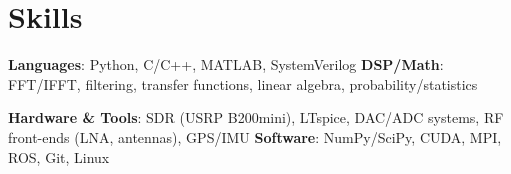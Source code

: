 \documentclass[letterpaper,10pt]{article}
\begin{document}
\section{Skills}
 \resumeSubHeadingListStart
   \item{
     \textbf{Languages}{: Python, C/C++, MATLAB, SystemVerilog}
     \hfill
     \textbf{DSP/Math}{: FFT/IFFT, filtering, transfer functions, linear algebra, probability/statistics}
   }
   \item{
     \textbf{Hardware \& Tools}{: SDR (USRP B200mini), LTspice, DAC/ADC systems, RF front-ends (LNA, antennas), GPS/IMU}
     \hfill
     \textbf{Software}{: NumPy/SciPy, CUDA, MPI, ROS, Git, Linux}
   }
 \resumeSubHeadingListEnd

\end{document}
